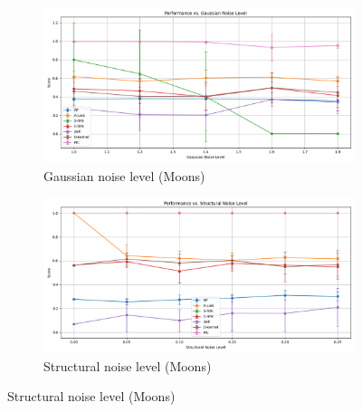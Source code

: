 \documentclass[
	10pt,
	parskip=half-,	
	paper=a4,
	english
	]{scrartcl}
\begin{document}
\begin{figure}[h!]
    \vspace{0.3cm}
    
    \begin{subfigure}[b]{0.45\textwidth}
        \includegraphics[width=\textwidth]{../data/plots/results_gaussian_noise_moons.png}
        \caption{Gaussian noise level (Moons)}
    \end{subfigure}
    \begin{subfigure}[b]{0.45\textwidth}
        \includegraphics[width=\textwidth]{../data/plots/results_structural_noise_moons.png}
        \caption{Structural noise level (Moons)}
    \end{subfigure}
    
    \vspace{0.3cm}
    

\end{figure}
\end{document}
